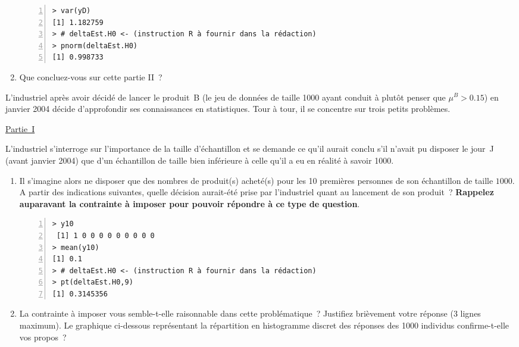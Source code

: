 \documentclass[10pt]{report}
\begin{document}
\begin{exercice}
\begin{enumerate}
\IndicR
\begin{Verbatim}[frame=leftline,fontfamily=tt,fontshape=n,numbers=left]
> var(yD)
[1] 1.182759
> # deltaEst.H0 <- (instruction R à fournir dans la rédaction)
> pnorm(deltaEst.H0)
[1] 0.998733
\end{Verbatim}

 



\item Que concluez-vous sur cette partie II~?




\end{enumerate}

\end{exercice}

\begin{exercice}
L'industriel après avoir décidé de lancer le produit~B (le jeu de données de taille 1000 ayant conduit à plutôt penser que $\mu^B>0.15$) en janvier 2004 décide d'approfondir ses connaissances en statistiques. Tour à tour, il se concentre sur trois petits problèmes. 

\noindent \underline{Partie~I}

L'industriel s'interroge sur l'importance de la taille d'échantillon et se demande ce qu'il aurait conclu s'il n'avait pu disposer le jour~J (avant janvier 2004) que d'un échantillon de taille bien inférieure à celle qu'il a eu en réalité à savoir 1000. 

\begin{enumerate}
\item Il s'imagine alors ne disposer que des nombres de produit(s) acheté(s) pour les 10 premières personnes de son échantillon de taille $1000$.  A partir des indications suivantes, quelle décision aurait-été prise par l'industriel quant au lancement de son produit~? \textbf{Rappelez auparavant la contrainte à imposer pour pouvoir répondre à ce type de question}. 

\IndicR
\begin{Verbatim}[frame=leftline,fontfamily=tt,fontshape=n,numbers=left]
> y10
 [1] 1 0 0 0 0 0 0 0 0 0
> mean(y10)
[1] 0.1
> # deltaEst.H0 <- (instruction R à fournir dans la rédaction)
> pt(deltaEst.H0,9)
[1] 0.3145356
\end{Verbatim}

 




\item La contrainte à imposer vous semble-t-elle raisonnable dans cette problématique~?  Justifiez brièvement votre réponse (3 lignes maximum). Le graphique ci-dessous représentant la répartition en histogramme discret des réponses des 1000 individus confirme-t-elle vos propos~?






\end{enumerate}
\end{exercice}
\end{document}
